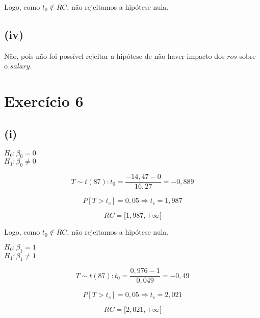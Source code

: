 \documentclass[hidelinks,11pt]{book}
\theoremstyle{definition}
\begin{document}
Logo, como $t_0 \not \in RC$, não rejeitamos a hipótese nula.

\subsection*{(iv)}

Não, pois não foi possível rejeitar a hipótese de não haver impacto dos $ros$ sobre o $salary$.

\section*{Exercício 6}

\subsection*{(i)}

\begin{center}
	$H_0 : \beta_{0} = 0$\\
	$H_1 : \beta_{0} \not = 0$
\end{center}

\begin{displaymath}
	T \sim t(87): t_0 = \frac{-14,47 - 0} {16,27} = -0,889
\end{displaymath}

\begin{displaymath}
	P[T > t_c ] = 0,05 \Rightarrow t_c = 1,987
\end{displaymath}

\begin{displaymath}
	RC = [1,987, +\infty[
\end{displaymath}

Logo, como $t_0 \not \in RC$, não rejeitamos a hipótese nula.

\begin{center}
	$H_0 : \beta_{1} = 1$\\
	$H_1 : \beta_{1} \not = 1$
\end{center}

\begin{displaymath}
	T \sim t(87): t_0 = \frac{0,976 - 1} {0,049} = -0,49
\end{displaymath}

\begin{displaymath}
	P[T > t_c ] = 0,05 \Rightarrow t_c = 2,021
\end{displaymath}

\begin{displaymath}
	RC = [2,021, +\infty[
\end{displaymath}
\end{document}
